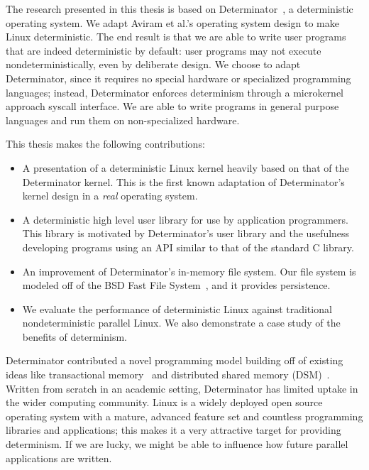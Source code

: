 The research presented in this thesis is based on Determinator~\cite{Aviram10},
a deterministic operating system. We adapt Aviram et al.'s operating system
design to make Linux deterministic. The end result is that we are able to write
user programs that are indeed deterministic by default: user programs may not
execute nondeterministically, even by deliberate design. We choose to adapt
Determinator, since it requires no special hardware or specialized programming
languages; instead, Determinator enforces determinism through a microkernel
approach syscall interface. We are able to write programs in general purpose
languages and run them on non-specialized hardware.

This thesis makes the following contributions:

\begin{itemize}
    \item A presentation of a deterministic Linux kernel heavily based on that
    of the Determinator kernel. This is the first known adaptation of
    Determinator's kernel design in a \emph{real} operating system.
    \item A deterministic high level user library for use by application
    programmers. This library is motivated by Determinator's user library and
    the usefulness developing programs using an API similar to that of the
    standard C library.
    \item An improvement of Determinator's in-memory file system. Our file
    system is modeled off of the BSD Fast File System~\cite{mckusick1984fast},
    and it provides persistence.
    \item We evaluate the performance of deterministic Linux against traditional
    nondeterministic parallel Linux. We also demonstrate a case study of the
    benefits of determinism.
\end{itemize}

\iffalse
This thesis also presents an accompanying
user level C library, akin to the library utilities discussed by Aviram et al.
This user library is intended to simplify writing user programs in C using
familiar high level abstractions such as fork-join. We also provide an in memory
file system, improving upon Arivam et al.'s in memory file system design.
\fi

Determinator contributed a novel programming model building off of existing
ideas like transactional memory~\cite{herlihy1993transactional} and distributed
shared memory (DSM)~\cite{amza1996treadmarks}. Written from scratch in an
academic setting, Determinator has limited uptake in the wider computing
community. Linux is a widely deployed open source operating system with a
mature, advanced feature set and countless programming libraries and
applications; this makes it a very attractive target for providing determinism.
If we are lucky, we might be able to influence how future parallel applications
are written.

